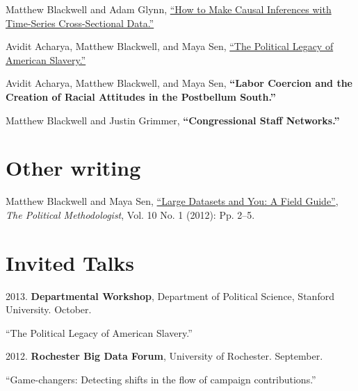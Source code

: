 \documentclass[margin,line]{res}
\newenvironment{list1}{
  \begin{list}{\ding{113}}{%
      \setlength{\itemsep}{0in}
      \setlength{\parsep}{0in} \setlength{\parskip}{0in}
      \setlength{\topsep}{0in} \setlength{\partopsep}{0in} 
      \setlength{\leftmargin}{0.83 cm}}}{\end{list}}
\begin{document}
\begin{resume}
Matthew Blackwell and Adam Glynn, \href{http://www.mattblackwell.org/files/papers/causal-tscs.pdf}{``How to Make Causal Inferences with Time-Series
  Cross-Sectional Data.''}

Avidit Acharya, Matthew Blackwell, and Maya Sen, \href{http://www.mattblackwell.org/files/papers/slavery.pdf}{``The Political Legacy of American Slavery.''}

Avidit Acharya, Matthew Blackwell, and Maya Sen, {\bf ``Labor Coercion and the Creation of Racial Attitudes in the Postbellum South.''}

Matthew Blackwell and Justin Grimmer, {\bf ``Congressional Staff Networks.''}



\section{\sc Other writing}

Matthew Blackwell and Maya Sen,
\href{http://polmeth.wustl.edu/methodologist/tpm_v20_n1.pdf}{``Large
  Datasets and You: A Field Guide''}, \emph{The Political
  Methodologist}, Vol. 10 No. 1 (2012): Pp. 2--5.

\section{\textsf{\sc Invited Talks}}
2013. {\bf Departmental Workshop}, Department of Political Science, Stanford University. October.
\begin{list1}
\item[] ``The Political Legacy of American Slavery.''
\end{list1}

2012. {\bf Rochester Big Data Forum}, University of Rochester. September.
\begin{list1}
\item[] ``Game-changers: Detecting shifts in the flow
  of campaign contributions.''
\end{list1}


\end{resume}
\end{document}
